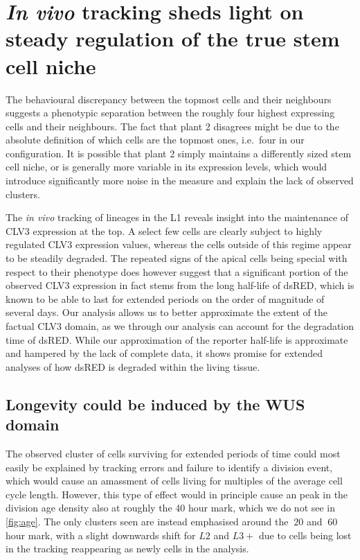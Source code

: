 \section{\textit{In vivo} tracking sheds light on steady regulation of the true stem
  cell niche}
The behavioural discrepancy between the topmost cells and their
neighbours suggests a phenotypic separation between the roughly four highest
expressing cells and their neighbours. The fact
that plant 2 disagrees  might be due to the
absolute definition of which cells are the topmost ones, i.e.\ four in our
configuration. It is possible that plant 2 simply maintains a differently sized
stem cell niche, or is generally more variable in its expression levels, which
would introduce significantly more noise in the measure and explain the lack of
observed clusters.  

The \textit{in vivo} tracking of lineages in the L1 reveals insight into the
maintenance of CLV3 expression at the top. A select few cells are clearly
subject to highly regulated CLV3 expression values, whereas the cells outside of
this regime appear to be steadily degraded. The repeated signs of the apical
cells being special with respect to their phenotype does however suggest that
a significant portion of the observed CLV3 expression in fact stems from the
long half-life of dsRED, which is known to be able to last for extended periods
on the order of magnitude of several days. Our analysis allows us to better
approximate the extent of the factual CLV3  
domain, as we through our analysis can account for the degradation time of dsRED.
While our approximation of the reporter half-life is approximate and hampered by
the lack of complete data, it shows promise for extended analyses of how dsRED
is degraded within the living tissue. 


\subsection{Longevity could be induced by the WUS domain}
The observed cluster of cells surviving for extended periods of time could most
easily be explained by tracking errors and failure to identify a division event,
which would cause an amassment of cells living for multiples of the average cell
cycle length. However, this type of effect would in principle cause an peak in
the division age density also at roughly the 40 hour mark, which we do not see
in \cref{fig:age}. The only clusters seen are instead emphasised around the
$~20$ and $~60$ hour mark, with a slight downwards shift for $L2$ and $L3+$ due
to cells being lost in the tracking reappearing as newly cells in the analysis.

